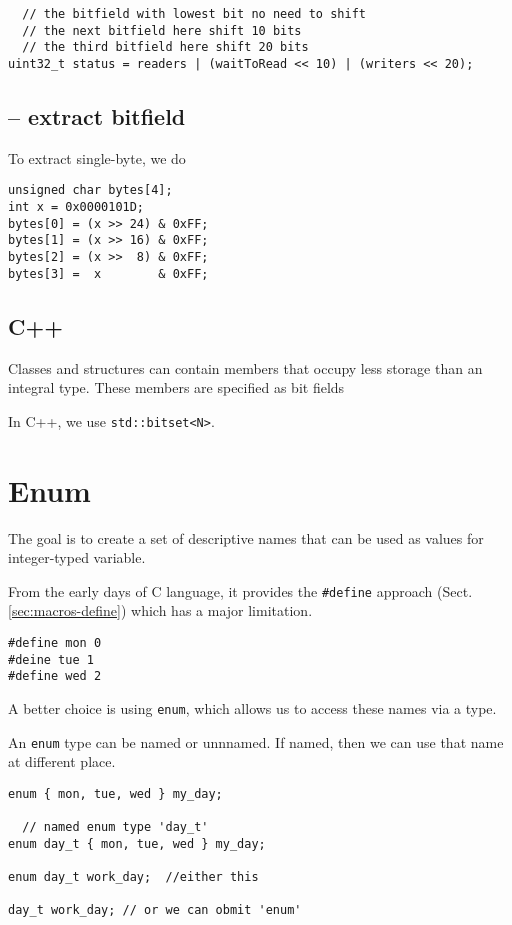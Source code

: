 \begin{lstlisting}
  // the bitfield with lowest bit no need to shift
  // the next bitfield here shift 10 bits
  // the third bitfield here shift 20 bits
uint32_t status = readers | (waitToRead << 10) | (writers << 20);
\end{lstlisting}

\subsection{-- extract bitfield}

To extract single-byte, we do
\begin{lstlisting}
unsigned char bytes[4];
int x = 0x0000101D;
bytes[0] = (x >> 24) & 0xFF;
bytes[1] = (x >> 16) & 0xFF;
bytes[2] = (x >>  8) & 0xFF;
bytes[3] =  x        & 0xFF;
\end{lstlisting}


\subsection{C++}
\label{sec:bitset}

Classes and structures can contain members that occupy less storage than an
integral type. These members are specified as bit fields


 In C++, we use \verb!std::bitset<N>!.

\section{Enum}
\label{sec:enum}

The goal is to create a set of descriptive names that can be used
as values for integer-typed variable. 

From the early days of C language, it provides the \verb!#define! approach
(Sect.\ref{sec:macros-define}) which has a major limitation.
\begin{verbatim}
#define mon 0
#deine tue 1
#define wed 2
\end{verbatim}

A better choice is using \verb!enum!, which allows us to access these names via a type.

An \verb!enum! type can be named or unnnamed. If named, then we can use that name at different place.
\begin{verbatim}
enum { mon, tue, wed } my_day;

  // named enum type 'day_t'
enum day_t { mon, tue, wed } my_day;

enum day_t work_day;  //either this

day_t work_day; // or we can obmit 'enum'
\end{verbatim}

